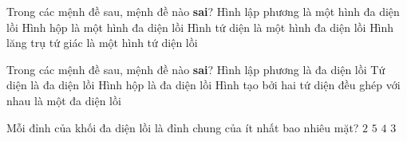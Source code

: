 \begin{ex}%
	Trong các mệnh đề sau, mệnh đề nào \textbf{sai}?
	\choice
	{Hình lập phương là một hình đa diện lồi}
	{Hình hộp là một hình đa diện lồi}
	{Hình tứ diện là một hình đa diện lồi}
	{\True Hình lăng trụ tứ giác là một hình tứ diện lồi}
\end{ex}
\begin{ex}%
	Trong các mệnh đề sau, mệnh đề nào \textbf{sai}?
	\choice
	{Hình lập phương là đa diện lồi}
	{Tứ diện là đa diện lồi}
	{Hình hộp là đa diện lồi}
	{\True Hình tạo bởi hai tứ diện đều ghép với nhau là một đa diện lồi}
\end{ex}
\begin{ex}%
	Mỗi đỉnh của khối đa diện lồi là đỉnh chung của ít nhất bao nhiêu mặt?
	\choice
	{$2$}
	{$5$}
	{$4$}
	{\True $3$}
\end{ex}
